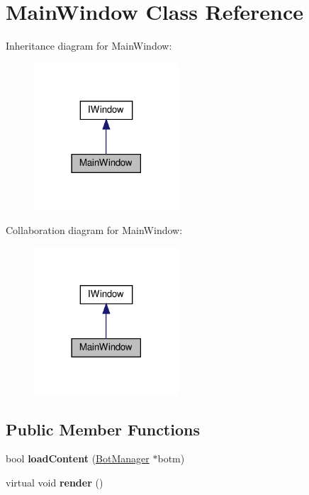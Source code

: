 \hypertarget{classMainWindow}{}\section{Main\+Window Class Reference}
\label{classMainWindow}


Inheritance diagram for Main\+Window\+:
\nopagebreak
\begin{figure}[H]
\begin{center}
\leavevmode
\includegraphics[width=153pt]{classMainWindow__inherit__graph}
\end{center}
\end{figure}


Collaboration diagram for Main\+Window\+:
\nopagebreak
\begin{figure}[H]
\begin{center}
\leavevmode
\includegraphics[width=153pt]{classMainWindow__coll__graph}
\end{center}
\end{figure}
\subsection*{Public Member Functions}
\begin{DoxyCompactItemize}
\item 
\mbox{\label{classMainWindow_a7ba85a974e015e328cb4261806f1fe98}} 
bool {\bfseries load\+Content} (\hyperlink{classBotManager}{Bot\+Manager} $\ast$botm)
\item 
\mbox{\label{classMainWindow_a68caf7a8144ec537e1358603da1043af}} 
virtual void {\bfseries render} ()
\end{DoxyCompactItemize}
